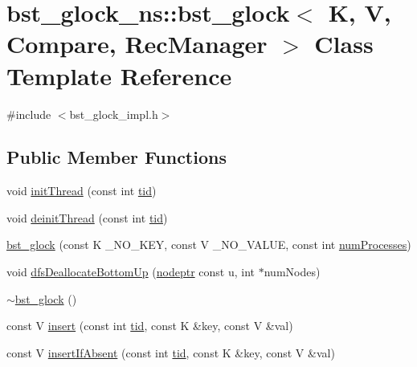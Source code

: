 \hypertarget{classbst__glock__ns_1_1bst__glock}{}\section{bst\+\_\+glock\+\_\+ns\+:\+:bst\+\_\+glock$<$ K, V, Compare, Rec\+Manager $>$ Class Template Reference}
\label{classbst__glock__ns_1_1bst__glock}


{\ttfamily \#include $<$bst\+\_\+glock\+\_\+impl.\+h$>$}

\subsection*{Public Member Functions}
\begin{DoxyCompactItemize}
\item 
void \hyperlink{classbst__glock__ns_1_1bst__glock_a379957b4de80cfcdf1f50eb74bda9601}{init\+Thread} (const int \hyperlink{microbench_2main_8cpp_a9ca9869868fe7e7a38a921cc7de4103f}{tid})
\item 
void \hyperlink{classbst__glock__ns_1_1bst__glock_a48520520abec6693b6a36e1d3740893a}{deinit\+Thread} (const int \hyperlink{microbench_2main_8cpp_a9ca9869868fe7e7a38a921cc7de4103f}{tid})
\item 
\hyperlink{classbst__glock__ns_1_1bst__glock_aa69faa0593101e2c584888c2bd3d20d1}{bst\+\_\+glock} (const K \+\_\+\+N\+O\+\_\+\+K\+EY, const V \+\_\+\+N\+O\+\_\+\+V\+A\+L\+UE, const int \hyperlink{testing_8cpp_aa085812188e21ede75351d88b9b2c30d}{num\+Processes})
\item 
void \hyperlink{classbst__glock__ns_1_1bst__glock_ad0d18633925cb4ae141c5dc52d2035c5}{dfs\+Deallocate\+Bottom\+Up} (\hyperlink{bst__rwlock__impl_8h_a04158d2a20768fe447133ff555823b05}{nodeptr} const u, int $\ast$num\+Nodes)
\item 
\hyperlink{classbst__glock__ns_1_1bst__glock_ad621272e8f1ad344efbdc9cab241ebf5}{$\sim$bst\+\_\+glock} ()
\item 
const V \hyperlink{classbst__glock__ns_1_1bst__glock_ac5304fe4db2baa083ad2d9316ae56adf}{insert} (const int \hyperlink{microbench_2main_8cpp_a9ca9869868fe7e7a38a921cc7de4103f}{tid}, const K \&key, const V \&val)
\item 
const V \hyperlink{classbst__glock__ns_1_1bst__glock_a61e825e84d189c8537431434537f24b3}{insert\+If\+Absent} (const int \hyperlink{microbench_2main_8cpp_a9ca9869868fe7e7a38a921cc7de4103f}{tid}, const K \&key, const V \&val)

\end{DoxyCompactItemize}
